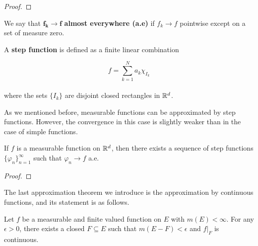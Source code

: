 \documentclass[12pt, a4paper, openany, twoside]{book}
\theoremstyle{definition}
\theoremstyle{remark}
\theoremstyle{plain}
\numberwithin{equation}{section}
\begin{document}
\begin{proof}
    
\end{proof}
\vspace{5mm}
\begin{tcolorbox}[colback=yellow!10!white,colframe=blue!75!black,title=Definition 1.4.5]\label{Definition 1.4.5}
    We say that $\boldsymbol{f_k\rightarrow f}$ \textbf{almost everywhere (a.e)} if $f_k\rightarrow f$ pointwise except on a set of measure zero.
\end{tcolorbox}
\vspace{5mm}
\begin{tcolorbox}[colback=yellow!10!white,colframe=blue!75!black,title=Definition 1.4.6]\label{Definition 1.4.6}
    A \textbf{step function} is defined as a finite linear combination

    \[f=\sum_{k=1}^{N}{a_k\chi_{I_k}}\]
    \\
    where the sets $\{I_k\}$ are disjoint closed rectangles in ${\mathbb {R}}^d$.
\end{tcolorbox}
\vspace{5mm}

As we mentioned before, measurable functions can be approximated by step functions. However, the convergence in this case is slightly weaker than in the case of simple functions.

\vspace{5mm}
\begin{tcolorbox}[colback=yellow!10!white,colframe=red!75!black,title=Theorem 1.4.10]\label{Theorem 1.4.10}
    If $f$ is a measurable function on ${\mathbb {R}}^d$, then there exists a sequence of step functions $\{\varphi_n\}_{n=1}^{\infty}$ such that $\varphi_n\rightarrow f$ a.e. 
\end{tcolorbox}
\begin{proof}
    
\end{proof}
\vspace{5mm}

The last approximation theorem we introduce is the approximation by continuous functions, and its statement is as follows.

\vspace{5mm}
\begin{tcolorbox}[colback=yellow!10!white,colframe=red!75!black,title=Theorem 1.4.11 (Lusin's Theorem)]\label{Theorem 1.4.11}
    Let $f$ be a measurable and finite valued function on $E$ with $m(E)<\infty$. For any $\epsilon>0$, there exists a closed $F\subseteq E$ such that $m(E-F)<\epsilon$ and $f|_F$ is continuous.
\end{tcolorbox}
\vspace{5mm}
\end{document}
